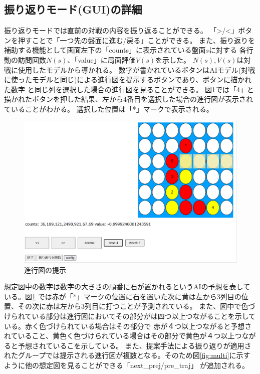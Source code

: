 \subsection{振り返りモード(GUI)の詳細}
振り返りモードでは直前の対戦の内容を振り返ることができる。
「>/<」ボタンを押すことで「一つ先の盤面に進む/戻る」ことができる。
また、振り返りを補助する機能として画面左下の「counts」に表示されている盤面$s$に対する
各行動の訪問回数$N(s)$、「value」に局面評価$V(s)$を示した。
$N(s),V(s)$は対戦に使用したモデルから導かれる。
数字が書かれているボタンはAIモデル(対戦に使ったモデルと同じ)による進行図を提示するボタンであり、ボタンに描かれた数字
と同じ列を選択した場合の進行図を見ることができる。
図\ref{fig:number-button}では「4」と描かれたボタンを押した結果、左から4番目を選択した場合の進行図が表示されていることがわかる。
選択した位置は「*」マークで表示される。
\begin{figure}[t]
	\centering
    \includegraphics[width=\linewidth]{./figure/trajSystem.pdf}
	\caption{進行図の提示}
	\label{fig:number-button}
\end{figure}
想定図中の数字は数字の大きさの順番に石が置かれるというAIの予想を表している。図\ref{fig:number-button}
では赤が「*」マークの位置に石を置いた次に黄は左から3列目の位置、その次に赤は左から3列目に打つことが予測されている。
また、図中で色づけられている部分は進行図においてその部分がは四つ以上つながることを示している。赤く色づけられている場合はその部分で
赤が４つ以上つながると予想されていること、黄色く色づけられている場合はその部分で黄色が４つ以上つながると予想されているこを示している。
また、提案手法による振り返りが適用されたグループでは提示される進行図が複数となる。そのため図\ref{fig:multi}に示すように他の想定図を見ることができる「next\_prej/pre\_traj」
が追加される。

